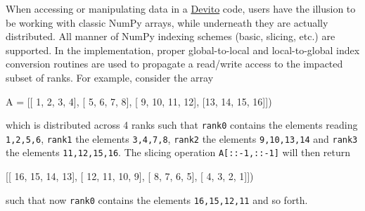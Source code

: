 \documentclass[10pt, conference]{IEEEtran}
\newenvironment{Shaded}{}{}
\newcommand{\DecValTok}[1]{\textcolor[rgb]{0.25,0.63,0.44}{{#1}}}
\newcommand{\NormalTok}[1]{{#1}}
\newcommand{\devito}{\href{https://github.com/devitocodes/devito}{Devito} }
\begin{document}
When accessing or manipulating data in a \devito code, users have the
illusion to be working with classic NumPy arrays, while underneath they
are actually distributed. All manner of NumPy indexing schemes (basic,
slicing, etc.) are supported. In the implementation, proper
global-to-local and local-to-global index conversion routines are used to
propagate a read/write access to the impacted subset of ranks. For
example, consider the array

\begin{Shaded}
\begin{Highlighting}[]
\NormalTok{A = [[ }\DecValTok{1}\NormalTok{,  }\DecValTok{2}\NormalTok{,  }\DecValTok{3}\NormalTok{,  }\DecValTok{4}\NormalTok{],}
     \NormalTok{[ }\DecValTok{5}\NormalTok{,  }\DecValTok{6}\NormalTok{,  }\DecValTok{7}\NormalTok{,  }\DecValTok{8}\NormalTok{],}
     \NormalTok{[ }\DecValTok{9}\NormalTok{, }\DecValTok{10}\NormalTok{, }\DecValTok{11}\NormalTok{, }\DecValTok{12}\NormalTok{],}
     \NormalTok{[}\DecValTok{13}\NormalTok{, }\DecValTok{14}\NormalTok{, }\DecValTok{15}\NormalTok{, }\DecValTok{16}\NormalTok{]])}
\end{Highlighting}
\end{Shaded}
\noindent
which is distributed across 4 ranks such that \texttt{rank\phantom{\ }0}
contains the elements reading
\texttt{1,\phantom{\ }2,\phantom{\ }5,\phantom{\ }6},
\texttt{rank\phantom{\ }1} the elements
\texttt{3,\phantom{\ }4,\phantom{\ }7,\phantom{\ }8},
\texttt{rank\phantom{\ }2} the elements
\texttt{9,\phantom{\ }10,\phantom{\ }13,\phantom{\ }14} and
\texttt{rank\phantom{\ }3} the elements
\texttt{11,\phantom{\ }12,\phantom{\ }15,\phantom{\ }16}. The slicing
operation \texttt{A{[}::-1,\phantom{\ }::-1{]}} will then return

\begin{Shaded}
\begin{Highlighting}[]
    \NormalTok{[[ }\DecValTok{16}\NormalTok{, }\DecValTok{15}\NormalTok{, }\DecValTok{14}\NormalTok{, }\DecValTok{13}\NormalTok{],}
     \NormalTok{[ }\DecValTok{12}\NormalTok{, }\DecValTok{11}\NormalTok{, }\DecValTok{10}\NormalTok{,  }\DecValTok{9}\NormalTok{],}
     \NormalTok{[  }\DecValTok{8}\NormalTok{,  }\DecValTok{7}\NormalTok{,  }\DecValTok{6}\NormalTok{,  }\DecValTok{5}\NormalTok{],}
     \NormalTok{[  }\DecValTok{4}\NormalTok{,  }\DecValTok{3}\NormalTok{,  }\DecValTok{2}\NormalTok{,  }\DecValTok{1}\NormalTok{]])}
\end{Highlighting}
\end{Shaded}
\noindent
such that now \texttt{rank\phantom{\ }0} contains the elements
\texttt{16,\phantom{\ }15,\phantom{\ }12,\phantom{\ }11} and so forth.
\end{document}
